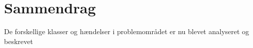 \section{Sammendrag}

De forskellige klasser og hændelser i problemområdet er nu blevet analyseret og beskrevet